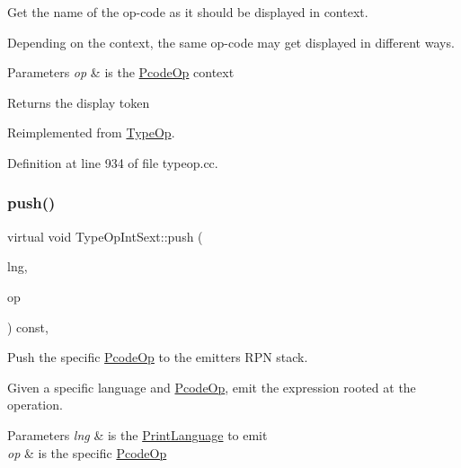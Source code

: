 Get the name of the op-\/code as it should be displayed in context. 

Depending on the context, the same op-\/code may get displayed in different ways. 
\begin{DoxyParams}{Parameters}
{\em op} & is the \mbox{\hyperlink{class_pcode_op}{Pcode\+Op}} context \\
\hline
\end{DoxyParams}
\begin{DoxyReturn}{Returns}
the display token 
\end{DoxyReturn}


Reimplemented from \mbox{\hyperlink{class_type_op_a42a1ffa77f998df24efdb44405b33ac5}{Type\+Op}}.



Definition at line 934 of file typeop.\+cc.

\mbox{\label{class_type_op_int_sext_a4d2972f2739cfc477d2f9762c94417c0}} 
\subsubsection{\texorpdfstring{push()}{push()}}
{\footnotesize\ttfamily virtual void Type\+Op\+Int\+Sext\+::push (\begin{DoxyParamCaption}\item[{\mbox{\hyperlink{class_print_language}{Print\+Language}} $\ast$}]{lng,  }\item[{const \mbox{\hyperlink{class_pcode_op}{Pcode\+Op}} $\ast$}]{op }\end{DoxyParamCaption}) const\hspace{0.3cm}{\ttfamily [inline]}, {\ttfamily [virtual]}}



Push the specific \mbox{\hyperlink{class_pcode_op}{Pcode\+Op}} to the emitter\textquotesingle{}s R\+PN stack. 

Given a specific language and \mbox{\hyperlink{class_pcode_op}{Pcode\+Op}}, emit the expression rooted at the operation. 
\begin{DoxyParams}{Parameters}
{\em lng} & is the \mbox{\hyperlink{class_print_language}{Print\+Language}} to emit \\
\hline
{\em op} & is the specific \mbox{\hyperlink{class_pcode_op}{Pcode\+Op}} \\
\hline
\end{DoxyParams}



